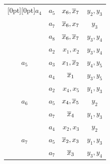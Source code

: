 \begin{table}
\begin{center}
\begin{minipage}[t]{190pt}
\begin{tabular}{|c|c|c|c|}
\multicolumn{1}{|c|}{\raisebox{-6pt}[0pt][0pt]{$a_4$}} & $a_5$ & $x_6,\overline x_7$ & $y_2,y_3$\\






 & $a_7$ & $\overline x_6,x_7$ & $y_3$\\






 & $a_8$ & $\overline x_6,\overline x_7$ & $y_3,y_4$\\


\hline




   & $a_2$ & $x_1,x_2$ & $y_3,y_4$ \\






$a_5$ & $a_3$ & $x_1,\overline x_2$ & $y_4,y_5$ \\






 & $a_4$ & $\overline x_1$ & $y_3,y_5$ \\




\hline


  & $a_2$ & $x_4,x_5$ & $y_1,y_3$ \\






$a_6$ & $a_5$ & $x_4,\overline x_5$ & $y_2$ \\






 & $a_7$ & $\overline x_4$ & $y_1,y_3$ \\




\hline


  & $a_4$ & $x_2,x_3$ & $y_2$ \\






$a_7$ & $a_5$ & $\overline x_2,x_3$ & $y_1,y_3$ \\






 & $a_7$ & $\overline x_3$ & $y_3,y_4$ \\



\end{tabular}
\end{minipage}
\end{center}
\end{table}
